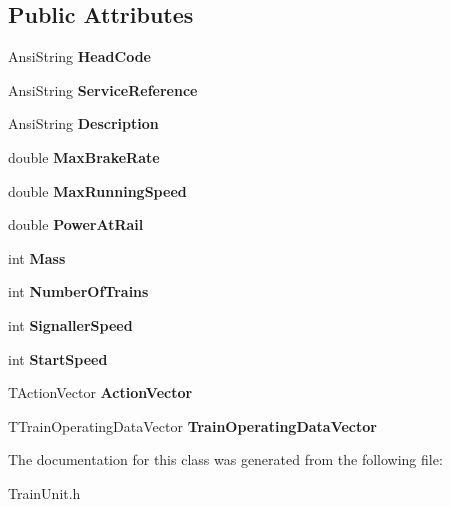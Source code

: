 \subsection*{Public Attributes}
\begin{DoxyCompactItemize}
\item 
\mbox{\label{class_t_train_data_entry_aa1c7c0c8f2437744f49d7e2856180dd8}} 
Ansi\+String {\bfseries Head\+Code}
\item 
\mbox{\label{class_t_train_data_entry_aadf0846698c4d7d596c9280037834456}} 
Ansi\+String {\bfseries Service\+Reference}
\item 
\mbox{\label{class_t_train_data_entry_aea5870826c3c6815472e86d82b0c9fe7}} 
Ansi\+String {\bfseries Description}
\item 
\mbox{\label{class_t_train_data_entry_a3d7e696d79ee15cae196c0197fed3821}} 
double {\bfseries Max\+Brake\+Rate}
\item 
\mbox{\label{class_t_train_data_entry_aaef868581a7c5383f70f119b1f551178}} 
double {\bfseries Max\+Running\+Speed}
\item 
\mbox{\label{class_t_train_data_entry_a41d5f92deb8a429cad0e1dadf2727fe4}} 
double {\bfseries Power\+At\+Rail}
\item 
\mbox{\label{class_t_train_data_entry_a16d6c71abfab0a1ebd961fe3cd3edae7}} 
int {\bfseries Mass}
\item 
\mbox{\label{class_t_train_data_entry_a977ccbe485d557d4c4a597f5de2251c4}} 
int {\bfseries Number\+Of\+Trains}
\item 
\mbox{\label{class_t_train_data_entry_a5ffd52b10fc56a29a823b918a40197e8}} 
int {\bfseries Signaller\+Speed}
\item 
\mbox{\label{class_t_train_data_entry_a573e640a04585cde4c5bbe2bced866d6}} 
int {\bfseries Start\+Speed}
\item 
\mbox{\label{class_t_train_data_entry_a73872a2abaa9d09a3f392b4e6f725289}} 
T\+Action\+Vector {\bfseries Action\+Vector}
\item 
\mbox{\label{class_t_train_data_entry_a384ddee4ede5a1962011bdc0fc3c7587}} 
T\+Train\+Operating\+Data\+Vector {\bfseries Train\+Operating\+Data\+Vector}
\end{DoxyCompactItemize}


The documentation for this class was generated from the following file\+:\begin{DoxyCompactItemize}
\item 
Train\+Unit.\+h\end{DoxyCompactItemize}
